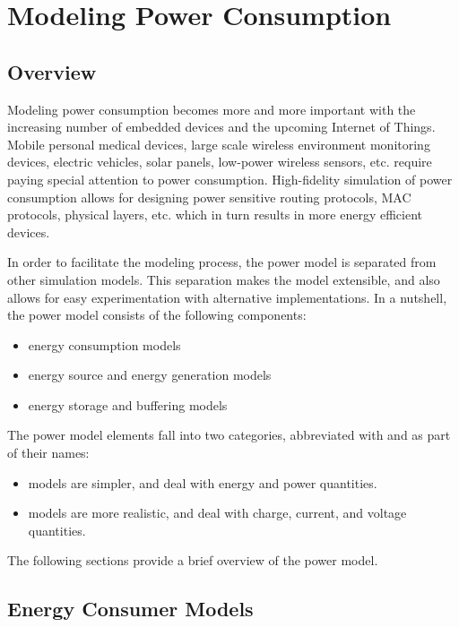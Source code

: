 \chapter{Modeling Power Consumption}
\label{cha:power}

\section{Overview}
\label{sec:power:overview}

Modeling power consumption becomes more and more important with the increasing
number of embedded devices and the upcoming Internet of Things. Mobile personal
medical devices, large scale wireless environment monitoring devices, electric
vehicles, solar panels, low-power wireless sensors, etc. require paying special
attention to power consumption. High-fidelity simulation of power
consumption allows for designing power sensitive routing protocols, MAC protocols,
physical layers, etc. which in turn results in more energy efficient devices.

In order to facilitate the modeling process, the power model is separated from other
simulation models. This separation makes the model extensible, and also allows for
easy experimentation with alternative implementations. In a nutshell, the power
model consists of the following components:

\begin{itemize}
  \item energy consumption models
  \item energy source and energy generation models
  \item energy storage and buffering models
\end{itemize}

The power model elements fall into two categories, abbreviated with 
and  as part of their names:

\begin{itemize}
  \item {} models are simpler, and deal with energy and power quantities.
  \item {} models are more realistic, and deal with charge, current, and voltage quantities.
\end{itemize}

The following sections provide a brief overview of the power model.

\section{Energy Consumer Models}
\label{sec:power:energy-consumer-models}

